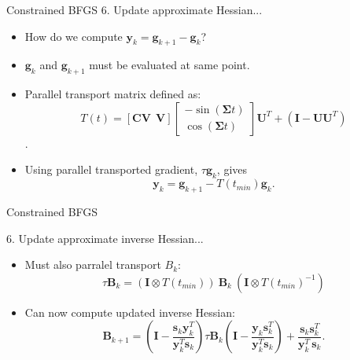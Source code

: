 \documentclass{beamer}
\begin{document}
\begin{frame}{Constrained BFGS}
6. Update approximate Hessian...
\begin{itemize}
\item<1->{How do we compute $\mathbf{y}_k = \mathbf{g}_{k+1} - \mathbf{g}_{k}$?}
\item<1->{$\mathbf{g}_{k}$ and $\mathbf{g}_{k+1}$ must be evaluated at \alert{same point}.} 

\item<2->{Parallel transport matrix defined as:
$$T(t) = \left[\mathbf{C} \mathbf{V}\ \ \mathbf{V} \right] \left[
 \begin{matrix}
 -\sin(\mathbf{\Sigma} t)\\
  \cos(\mathbf{\Sigma} t)
  \end{matrix} \right] \mathbf{U}^T + (\mathbf{I} - \mathbf{U} \mathbf{U}^T)$$.}
\item<2->{Using parallel transported gradient, $\tau \mathbf{g}_k$, gives $$\mathbf{y}_k = \mathbf{g}_{k+1} - T(t_{min})\mathbf{g}_{k}.$$
  } 
 \end{itemize}
\end{frame}

\begin{frame}{Constrained BFGS}

6. Update approximate inverse Hessian...
\begin{itemize}
\item<1->{Must also parralel transport $B_{k}$:
$$\tau \mathbf{B}_k = (\mathbf{I} \otimes T(t_{min}))\ \mathbf{B}_k \ (\mathbf{I} \otimes T(t_{min})^{-1})$$}
\item<1->{Can now compute updated inverse Hessian:
$$\mathbf{B}_{k+1} =  \left (\mathbf{I}-\frac { \mathbf{s}_k \mathbf{y}_k^{T}} {\mathbf{y}_k^{T} \mathbf{s}_k} \right ) \tau \mathbf{B}_{k} \left (\mathbf{I}-\frac { \mathbf{y}_k \mathbf{s}_k^{T}} {\mathbf{y}_k^{T} \mathbf{s}_k} \right )+\frac
{\mathbf{s}_k \mathbf{s}_k^{T}} {\mathbf{y}_k^{T} \, \mathbf{s}_k}.$$}
 \end{itemize}
 \vspace{2em}

\end{frame}
\end{document}
